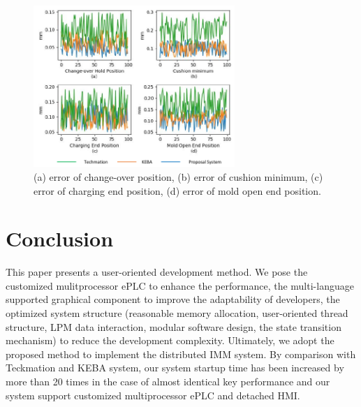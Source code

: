 \documentclass[journal,UTF8]{IEEEtran}
\begin{document}
\begin{figure}
	\centering
	\includegraphics[width=3in]{fig/Compare.pdf}
	\caption{(a) error of change-over position, (b) error of cushion minimum, (c) error of charging end position, (d) error of mold open end position.}
	\label{fig:Compare}
\end{figure}
\section{Conclusion}
\label{conclusion}
This paper presents a user-oriented development method. We pose the customized mulitprocessor ePLC to enhance the performance, the multi-language supported graphical component to improve the adaptability of developers, the optimized system structure (reasonable memory allocation, user-oriented thread structure, LPM data interaction, modular software design, the state transition mechanism) to reduce the development complexity. Ultimately, we adopt the proposed method to implement the distributed IMM system. By comparison with Teckmation and KEBA system, our system startup time has been increased by more than 20 times in the case of almost identical key performance and our system support customized multiprocessor ePLC and detached HMI.





\ifCLASSOPTIONcaptionsoff
  \newpage
\fi





%
%
%
\end{document}

